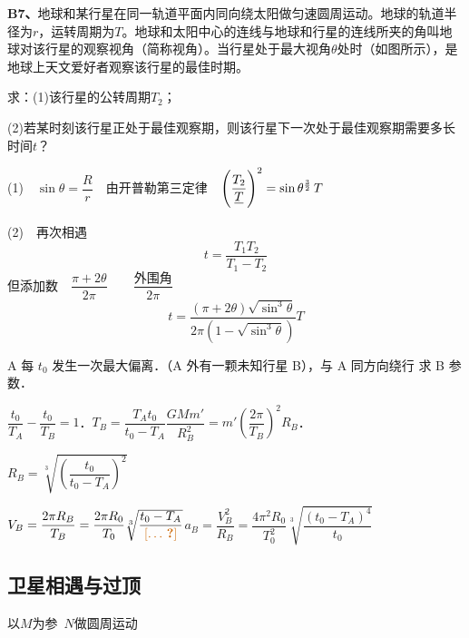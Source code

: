 \begin{problem}[B7]
\textbf{B7、}地球和某行星在同一轨道平面内同向绕太阳做匀速圆周运动。地球的轨道半径为$r$，运转周期为$T$。地球和太阳中心的连线与地球和行星的连线所夹的角叫地球对该行星的观察视角（简称视角）。当行星处于最大视角$\theta$处时（如图所示），是地球上天文爱好者观察该行星的最佳时期。

求：(1)该行星的公转周期$T_2$；

(2)若某时刻该行星正处于最佳观察期，则该行星下一次处于最佳观察期需要多长时间$t$？
\begin{solution}
(1)　$\sin\theta=\dfrac{R}{r}$　由开普勒第三定律　$\left(\dfrac{T_2}{\struck{T}}\right)^{2}=\sin\theta^{\frac{3}{2}}\,T$ %
\medskip

(2)　再次相遇
\[ t=\dfrac{T_1T_2}{T_1-T_2} \]
但添加数　$\dfrac{\pi+2\theta}{2\pi}$　　$\dfrac{\text{外围角}}{2\pi}$
\[ t=\dfrac{(\pi+2\theta)\sqrt{\sin^3\theta}}{2\pi\left(1-\sqrt{\sin^3\theta}\right)}T \]
\end{solution}
\end{problem}

\begin{problem}[11]
A 每 $t_0$ 发生一次最大偏离．（A 外有一颗未知行星 B），与 A 同方向绕行 求 B 参数．


\begin{solution}
$\dfrac{t_0}{T_A}-\dfrac{t_0}{T_B}=1$．\quad $T_B=\dfrac{T_At_0}{t_0-T_A}$\quad $\dfrac{GMm'}{R_B^{2}}=m'\left(\dfrac{2\pi}{T_B}\right)^{2}R_B$．

$R_B=\sqrt[3]{\left(\dfrac{t_0}{t_0-T_A}\right)^{2}}$%

$V_B=\dfrac{2\pi R_B}{T_B}=\dfrac{2\pi R_0}{T_0}\sqrt[3]{\dfrac{t_0-T_A}{\text{\unclear{…}}}}$\quad $a_B=\dfrac{V_B^{2}}{R_B}=\dfrac{4\pi^{2}R_0}{T_0^{2}}\sqrt[3]{\dfrac{(t_0-T_A)^{4}}{t_0}}$%
\end{solution}
\end{problem}

\subsection{卫星相遇与过顶}
以$M$为参\ $N$做圆周运动 %


